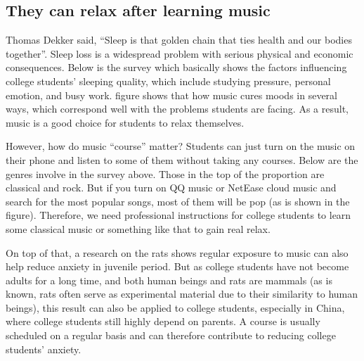 \subsection{They can relax after learning music}
Thomas Dekker said, “Sleep is that golden chain that ties health and our bodies together”. Sleep loss is a widespread problem with serious physical and economic consequences. Below is the survey which basically shows the factors influencing college students’ sleeping quality, which include studying pressure, personal emotion, and busy work. figure shows that how music cures moods in several ways, which correspond well with the problems students are facing. As a result, music is a good choice for students to relax themselves.\par
However, how do music “course” matter? Students can just turn on the music on their phone and listen to some of them without taking any courses. Below are the genres involve in the survey above. Those in the top of the proportion are classical and rock. But if you turn on QQ music or NetEase cloud music and search for the most popular songs, most of them will be pop (as is shown in the figure). Therefore, we need professional instructions for college students to learn some classical music or something like that to gain real relax.\par
On top of that, a research on the rats shows regular exposure to music can also help reduce anxiety in juvenile period. But as college students have not become adults for a long time, and both human beings and rats are mammals (as is known, rats often serve as experimental material due to their similarity to human beings), this result can also be applied to college students, especially in China, where college students still highly depend on parents. A course is usually scheduled on a regular basis and can therefore contribute to reducing college students’ anxiety.\par

